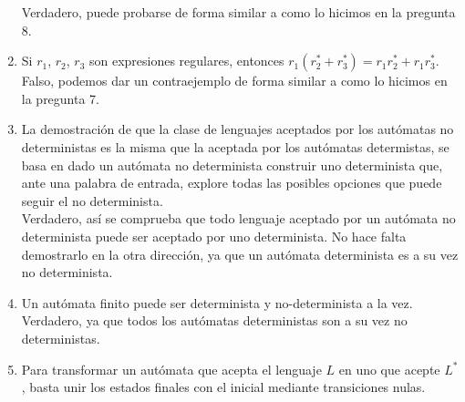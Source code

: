 \begin{enumerate}
        Verdadero, puede probarse de forma similar a como lo hicimos en la pregunta 8.
    \item Si $r_1$, $r_2$, $r_3$ son expresiones regulares, entonces $r_1(r_2^\ast + r_3^\ast) = r_1r_2^\ast + r_1r_3^\ast$.\\

        Falso, podemos dar un contraejemplo de forma similar a como lo hicimos en la pregunta 7.
    \item La demostración de que la clase de lenguajes aceptados por los autómatas no deterministas es la misma que la aceptada por los autómatas determistas, se basa en dado un autómata no determinista construir uno determinista que, ante una palabra de entrada, explore todas las posibles opciones que puede seguir el no determinista.\\

        Verdadero, así se comprueba que todo lenguaje aceptado por un autómata no determinista puede ser aceptado por uno determinista. No hace falta demostrarlo en la otra dirección, ya que un autómata determinista es a su vez no determinista.
    \item Un autómata finito puede ser determinista y no-determinista a la vez.\\

        Verdadero, ya que todos los autómatas deterministas son a su vez no deterministas.
    \item Para transformar un autómata que acepta el lenguaje $L$ en uno que acepte $L^\ast$, basta unir los estados finales con el inicial mediante transiciones nulas.\\


\end{enumerate}
